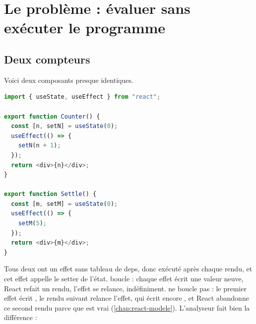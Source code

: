 \section{Le problème : évaluer  sans exécuter le programme}
\label{sec:transfert-stores-probleme}

\subsection{Deux compteurs}

Voici deux composants presque identiques.

\begin{lstlisting}[language=TypeScript,caption={Deux compteurs (\file{/tmp/ch11/counter.tsx})},label={lst:transfert-stores-counter}]
import { useState, useEffect } from "react";

export function Counter() {
  const [n, setN] = useState(0);
  useEffect(() => {
    setN(n + 1);
  });
  return <div>{n}</div>;
}

export function Settle() {
  const [m, setM] = useState(0);
  useEffect(() => {
    setM(5);
  });
  return <div>{m}</div>;
}
\end{lstlisting}

Tous deux ont un effet sans tableau de deps, donc exécuté après chaque
rendu, et cet effet appelle le setter de l'état.  boucle : chaque
effet écrit une valeur neuve, React refait un rendu, l'effet se relance,
indéfiniment.  ne boucle pas : le premier effet écrit ,
le rendu suivant relance l'effet, qui écrit encore , et React
abandonne ce second rendu parce que  est vrai
(\cref{chap:react-modele}). L'analyseur fait bien la différence :


